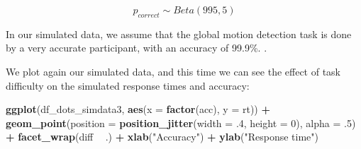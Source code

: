 \documentclass[12pt,]{krantz}
\newenvironment{Shaded}{\begin{snugshade}}{\end{snugshade}}
\newcommand{\KeywordTok}[1]{\textcolor[rgb]{0.13,0.29,0.53}{\textbf{#1}}}
\newcommand{\DataTypeTok}[1]{\textcolor[rgb]{0.13,0.29,0.53}{#1}}
\newcommand{\DecValTok}[1]{\textcolor[rgb]{0.00,0.00,0.81}{#1}}
\newcommand{\FloatTok}[1]{\textcolor[rgb]{0.00,0.00,0.81}{#1}}
\newcommand{\StringTok}[1]{\textcolor[rgb]{0.31,0.60,0.02}{#1}}
\newcommand{\OperatorTok}[1]{\textcolor[rgb]{0.81,0.36,0.00}{\textbf{#1}}}
\newcommand{\NormalTok}[1]{#1}
\theoremstyle{definition}
\theoremstyle{definition}
\theoremstyle{definition}
\theoremstyle{remark}
\begin{document}
\begin{equation}
p_{correct} \sim Beta(995, 5)
\end{equation}

In our simulated data, we assume that the global motion detection task
is done by a very accurate participant, with an accuracy of 99.9\%. .

\begin{Shaded}
\end{Shaded}

We plot again our simulated data, and this time we can see the effect of
task difficulty on the simulated response times and accuracy:

\begin{Shaded}
\begin{Highlighting}[]
\KeywordTok{ggplot}\NormalTok{(df_dots_simdata3, }\KeywordTok{aes}\NormalTok{(}\DataTypeTok{x =} \KeywordTok{factor}\NormalTok{(acc), }\DataTypeTok{y =}\NormalTok{ rt)) }\OperatorTok{+}
\StringTok{  }\KeywordTok{geom_point}\NormalTok{(}\DataTypeTok{position =} \KeywordTok{position_jitter}\NormalTok{(}\DataTypeTok{width =} \FloatTok{.4}\NormalTok{, }\DataTypeTok{height =} \DecValTok{0}\NormalTok{),}
             \DataTypeTok{alpha =} \FloatTok{.5}\NormalTok{) }\OperatorTok{+}
\StringTok{  }\KeywordTok{facet_wrap}\NormalTok{(diff }\OperatorTok{~}\StringTok{ }\NormalTok{.) }\OperatorTok{+}
\StringTok{  }\KeywordTok{xlab}\NormalTok{(}\StringTok{"Accuracy"}\NormalTok{) }\OperatorTok{+}
\StringTok{  }\KeywordTok{ylab}\NormalTok{(}\StringTok{"Response time"}\NormalTok{)}
\end{Highlighting}
\end{Shaded}
\end{document}
